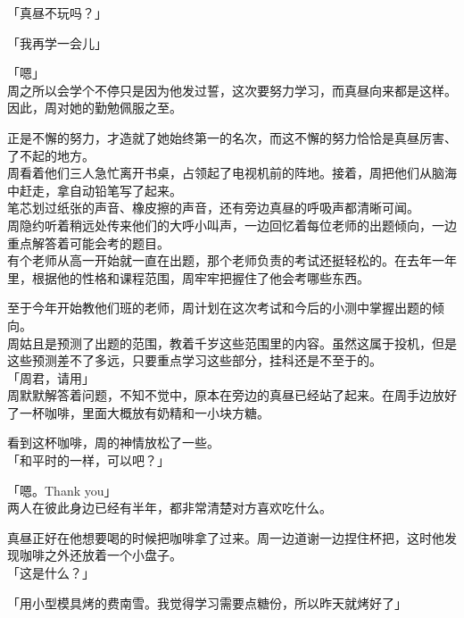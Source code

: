 「真昼不玩吗？」

「我再学一会儿」

「嗯」\\

周之所以会学个不停只是因为他发过誓，这次要努力学习，而真昼向来都是这样。因此，周对她的勤勉佩服之至。

正是不懈的努力，才造就了她始终第一的名次，而这不懈的努力恰恰是真昼厉害、了不起的地方。\\

周看着他们三人急忙离开书桌，占领起了电视机前的阵地。接着，周把他们从脑海中赶走，拿自动铅笔写了起来。\\

笔芯划过纸张的声音、橡皮擦的声音，还有旁边真昼的呼吸声都清晰可闻。\\

周隐约听着稍远处传来他们的大呼小叫声，一边回忆着每位老师的出题倾向，一边重点解答着可能会考的题目。\\

有个老师从高一开始就一直在出题，那个老师负责的考试还挺轻松的。在去年一年里，根据他的性格和课程范围，周牢牢把握住了他会考哪些东西。

至于今年开始教他们班的老师，周计划在这次考试和今后的小测中掌握出题的倾向。\\

周姑且是预测了出题的范围，教着千岁这些范围里的内容。虽然这属于投机，但是这些预测差不了多远，只要重点学习这些部分，挂科还是不至于的。\\

「周君，请用」\\

周默默解答着问题，不知不觉中，原本在旁边的真昼已经站了起来。在周手边放好了一杯咖啡，里面大概放有奶精和一小块方糖。

看到这杯咖啡，周的神情放松了一些。\\

「和平时的一样，可以吧？」

「嗯。Thank you」\\

两人在彼此身边已经有半年，都非常清楚对方喜欢吃什么。

真昼正好在他想要喝的时候把咖啡拿了过来。周一边道谢一边捏住杯把，这时他发现咖啡之外还放着一个小盘子。\\

「这是什么？」

「用小型模具烤的费南雪。我觉得学习需要点糖份，所以昨天就烤好了」\\

